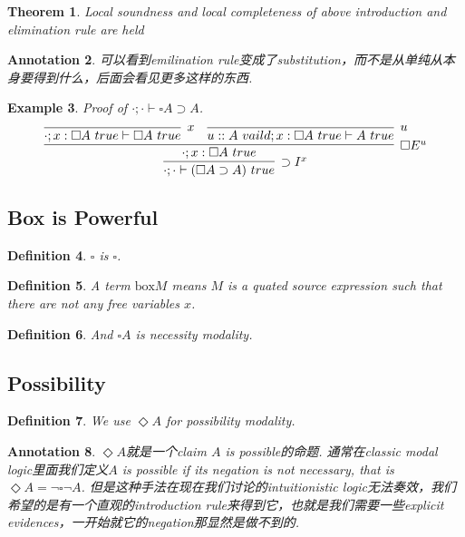 \documentclass{article}
\theoremstyle{plain}
\newtheorem{theorem}{Theorem}
\newtheorem{example}[theorem]{Example}
\newtheorem{definition}[theorem]{Definition}
\newtheorem{annotation}[theorem]{Annotation}
\theoremstyle{nonumberplain}
\begin{document}
\begin{theorem}
\rm Local soundness and local completeness of above introduction and elimination rule are held 
\end{theorem}

\begin{annotation}
\rm 可以看到emilination rule变成了substitution，而不是从单纯从本身要得到什么，后面会看见更多这样的东西. 
\end{annotation}


\begin{example}
\rm Proof of $\cdot;\cdot\vdash \square A \supset A$.
$$
\infer[\supset I^x]{\cdot;\cdot\vdash (\square A \supset A)~true}{\infer[\square E^u]{\cdot;x:\square A~true}{\infer[x]{\cdot;x:\square A~true \vdash \square A~true}{} & \infer[u]{u::A~vaild; x:\square A~true \vdash A~true}{}  }}
$$
\end{example}



\newpage
\subsection{Box is Powerful}

\begin{definition}
\rm $\square$ is $\square$. 
\end{definition}


\begin{definition}
\rm A term $\text{box} M$ means $M$ is a quated source expression such that there are not any free variables $x$. 
\end{definition}


\begin{definition}
\rm And $\square A$ is necessity modality. 
\end{definition}


\newpage
\subsection{Possibility}

\begin{definition}
\rm We use $\Diamond A$ for possibility modality.
\end{definition}

\begin{annotation}
\rm $\Diamond A$就是一个claim $A$ is possible的命题. 通常在classic modal logic里面我们定义$A$ is possible if its negation is not necessary, that is $\Diamond A = \neg \square \neg A$. 但是这种手法在现在我们讨论的intuitionistic logic无法奏效，我们希望的是有一个直观的introduction rule来得到它，也就是我们需要一些explicit evidences，一开始就它的negation那显然是做不到的. 
\end{annotation}
\end{document}
